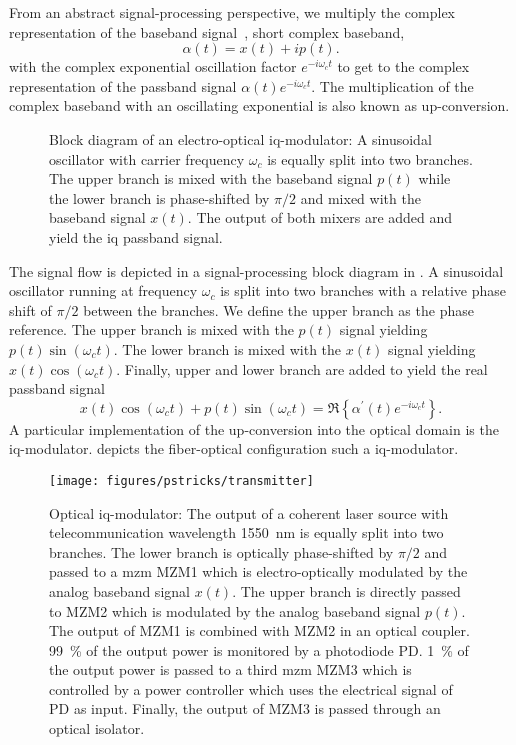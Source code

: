 From an abstract signal-processing perspective, we multiply the complex representation of the baseband signal~\cite[p.~25]{Madhow2008}, short complex baseband,
\begin{equation}
	\alpha(t)
	=
	x(t)
	+
	ip(t)
	.
\end{equation}
with the complex exponential oscillation factor $e^{-i\omega_ct}$ to get to the complex representation of the passband signal $\alpha(t)e^{-i\omega_ct}$.
The multiplication of the complex baseband with an oscillating exponential is also known as up-conversion.
\begin{figure}[htb]
	\centering
	
	\caption{Block diagram of an electro-optical \gls{iq}-modulator: A sinusoidal oscillator with carrier frequency $\omega_c$ is equally split into two branches. The upper branch is mixed with the baseband signal $p(t)$ while the lower branch is phase-shifted by $\pi/2$ and mixed with the baseband signal $x(t)$. The output of both mixers are added and yield the \gls{iq} passband signal.}\label{fig:iqmod}
\end{figure}
The signal flow is depicted in a signal-processing block diagram in .
A sinusoidal oscillator running at frequency $\omega_c$ is split into two branches with a relative phase shift of $\pi/2$ between the branches.
We define the upper branch as the phase reference.
The upper branch is mixed with the $p(t)$ signal yielding $p(t)\sin(\omega_ct)$.
The lower branch is mixed with the $x(t)$ signal yielding $x(t)\cos(\omega_ct)$.
Finally, upper and lower branch are added to yield the real passband signal
\begin{equation}
	x(t)
	\cos(\omega_ct)
	+
	p(t)
	\sin(\omega_ct)
	=
	\Re\left\{
		\alpha^\prime(t)
		e^{-i\omega_ct}
	\right\}
	\label{eq:passband_signal}.
\end{equation}
A particular implementation of the up-conversion into the optical domain is the \gls{iq}-modulator.
 depicts the fiber-optical configuration such a \gls{iq}-modulator.
\begin{figure}[htb]
	\centering
	\texttt{[image: figures/pstricks/transmitter]}
	\caption{Optical \gls{iq}-modulator: The output of a coherent laser source with telecommunication wavelength \SI{1550}{\nano\meter} is equally split into two branches. The lower branch is optically phase-shifted by $\pi/2$ and passed to a \gls{mzm} MZM1 which is electro-optically modulated by the analog baseband signal $x(t)$. The upper branch is directly passed to MZM2 which is modulated by the analog baseband signal $p(t)$. The output of MZM1 is combined with MZM2 in an optical coupler. \SI{99}{\percent} of the output power is monitored by a photodiode PD. \SI{1}{\percent} of the output power is passed to a third \gls{mzm} MZM3 which is controlled by a power controller which uses the electrical signal of PD as input. Finally, the output of MZM3 is passed through an optical isolator.}\label{fig:optical_transmitter}
\end{figure}
